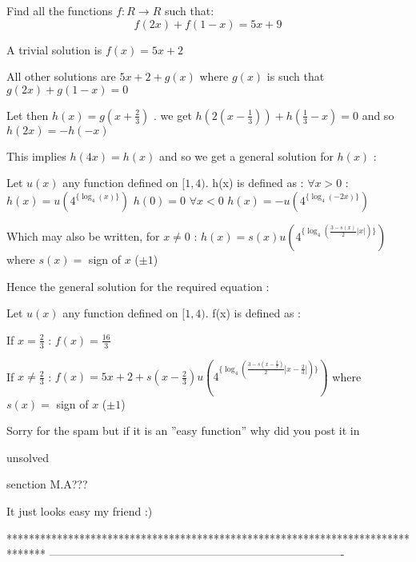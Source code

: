 \begin{solution}
	\begin{tcolorbox}Find all the functions $ f : R \to R$  such that:
\[ f(2x) + f(1 - x) = 5x + 9\]
\end{tcolorbox}

A trivial solution is $ f(x)=5x+2$

All other solutions are $ 5x+2+g(x)$ where $ g(x)$ is such that $ g(2x)+g(1-x)=0$

Let then $ h(x)=g(x+\frac 23)$ . we get $ h(2(x-\frac 13))+h(\frac 13-x)=0$ and so $ h(2x)=-h(-x)$

This implies $ h(4x)=h(x)$ and so we get a general solution for $ h(x)$ :

Let $ u(x)$ any function defined on $ [1,4)$. h(x) is defined as :
$ \forall x>0$ : $ h(x)=u(4^{\{\log_4(x)\}})$
$ h(0)=0$
$ \forall x<0$ $ h(x)=-u(4^{\{\log_4(-2x)\}})$

Which may also be written, for $ x\ne 0$ : $ h(x)=s(x)u(4^{\{\log_4(\frac{3-s(x)}2|x|)\}})$ where $ s(x)=$ sign of $ x$ ($ \pm 1$)

Hence the general solution for the required equation :

Let $ u(x)$ any function defined on $ [1,4)$. f(x) is defined as :

If $ x=\frac 23$ : $ f(x)=\frac{16}3$

If $ x\ne\frac 23$ : $ f(x)=5x+2+s(x-\frac 23)u(4^{\{\log_4(\frac{3-s(x-\frac 23)}2|x-\frac 23|)\}})$ where $ s(x)=$ sign of $ x$ ($ \pm 1$)
\end{solution}



\begin{solution}
	Sorry for the spam but if it is an ''easy function'' why did you post it in \begin{bolded}unsolved\end{bolded} senction M.A???
\end{solution}



\begin{solution}
	It just looks easy my friend  :)
\end{solution}
*******************************************************************************
-------------------------------------------------------------------------------

